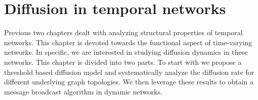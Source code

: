 \chapter{Diffusion in temporal networks}
Previous two chapters dealt with analyzing structural properties of temporal networks. This chapter is devoted towards the functional aspect of time-varying networks.  
In specific, we are interested in studying diffusion dynamics in these networks. 
This chapter is divided into two parts. To start with we propose a threshold based diffusion model and systematically analyze the diffusion rate for different underlying 
graph topologies. We then leverage these results to obtain a message broadcast algorithm in dynamic networks. 
















